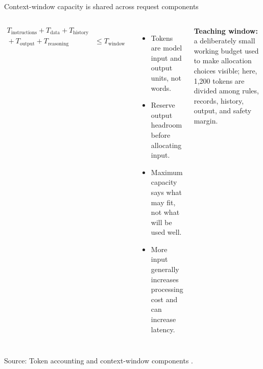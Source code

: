 \documentclass[aspectratio=169]{beamer}
\newcommand{\slidesource}[1]{\par\vfill\noindent\parbox{\linewidth}{\tiny\color{hrgray}\raggedright\sloppy Source: #1}}
\newcommand{\visualdescription}[1]{\par\vspace{.2em}\noindent\parbox{\linewidth}{\centering\tiny\color{hrgray}#1}}
\begin{document}
\begin{frame}{Context-window capacity is shared across request components}
\small
\begin{columns}[c]
\[
\begin{aligned}
T_{\mathrm{instructions}}+T_{\mathrm{data}}+T_{\mathrm{history}}\\
{}+T_{\mathrm{output}}+T_{\mathrm{reasoning}} &\leq T_{\mathrm{window}}
\end{aligned}
\]
\begin{itemize}\itemsep3pt
  \item Tokens are model input and output units, not words.
  \item Reserve output headroom before allocating input.
  \item Maximum capacity says what may fit, not what will be used well.
  \item More input generally increases processing cost and can increase latency.
\end{itemize}
\centering
{}
\visualdescription{\textbf{Teaching window:} a deliberately small working budget used to make allocation choices visible; here, 1,200 tokens are divided among rules, records, history, output, and safety margin.}
\end{columns}
\slidesource{Token accounting and context-window components \parencite{OpenAI2026ConversationState,OpenAI2026TokenCounting}.}
\end{frame}
\end{document}
